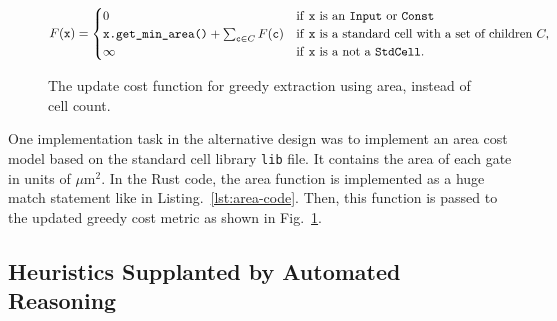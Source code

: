 \documentclass[10pt,letterpaper]{article}
\begin{document}
\begin{figure}[h!]
    \[
        F(\texttt{x}) = \begin{cases}
            0                                                                   & \text{if \texttt{x} is an \texttt{Input} or \texttt{Const}}        \\
            \texttt{x.get\_min\_area()} + \sum_{\texttt{c} \in C} F(\texttt{c}) & \text{if \texttt{x} is a standard cell with a set of children } C, \\
            \infty                                                              & \text{if \texttt{x} is a not a \texttt{StdCell}}.
        \end{cases}
    \]
    \caption{The update cost function for greedy extraction using area, instead of cell count.}\label{fig:costa}
\end{figure}

One implementation task in the alternative design was to implement an area cost
model based on the standard cell library \texttt{lib} file. It contains the
area of each gate in units of $\mu\text{m}^2$. In the Rust code, the area
function is implemented as a huge match statement like in
Listing.~\ref{lst:area-code}. Then, this function is passed to the updated
greedy cost metric as shown in Fig.~\ref{fig:costa}.

\subsection{Heuristics Supplanted by Automated Reasoning}\label{sec:alt:heuristics}
\end{document}
